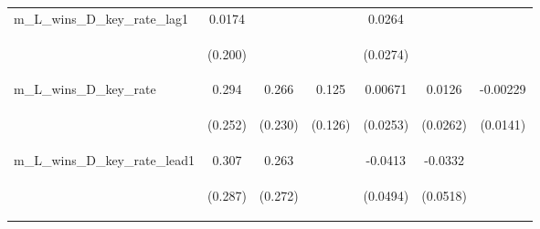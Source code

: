 \documentclass[]{article}
\begin{document}
\begin{center}
\begin{tabular}{lcccccc}
m\_L\_wins\_D\_key\_rate\_lag1 & 0.0174 &  &  & 0.0264 &  &  \\
\vspace{4pt} & \begin{footnotesize}(0.200)\end{footnotesize} & \begin{footnotesize}\end{footnotesize} & \begin{footnotesize}\end{footnotesize} & \begin{footnotesize}(0.0274)\end{footnotesize} & \begin{footnotesize}\end{footnotesize} & \begin{footnotesize}\end{footnotesize} \\
m\_L\_wins\_D\_key\_rate & 0.294 & 0.266 & 0.125 & 0.00671 & 0.0126 & -0.00229 \\
\vspace{4pt} & \begin{footnotesize}(0.252)\end{footnotesize} & \begin{footnotesize}(0.230)\end{footnotesize} & \begin{footnotesize}(0.126)\end{footnotesize} & \begin{footnotesize}(0.0253)\end{footnotesize} & \begin{footnotesize}(0.0262)\end{footnotesize} & \begin{footnotesize}(0.0141)\end{footnotesize} \\
m\_L\_wins\_D\_key\_rate\_lead1 & 0.307 & 0.263 &  & -0.0413 & -0.0332 &  \\
\vspace{4pt} & \begin{footnotesize}(0.287)\end{footnotesize} & \begin{footnotesize}(0.272)\end{footnotesize} & \begin{footnotesize}\end{footnotesize} & \begin{footnotesize}(0.0494)\end{footnotesize} & \begin{footnotesize}(0.0518)\end{footnotesize} & \begin{footnotesize}\end{footnotesize} \\

\end{tabular}
\end{center}
\end{document}
